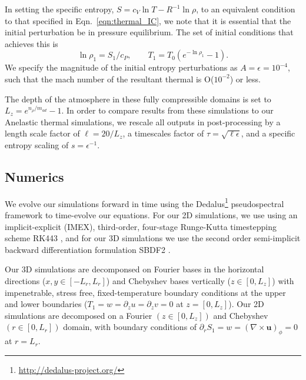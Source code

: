 \documentclass[twocolumn, amsmath, amsfonts, amssymb, trackchanges]{aastex62}
\newcommand{\grad}{\ensuremath{\nabla}}
\begin{document}
In setting the specific entropy, $S = c_V \ln T - R^{-1}\ln\rho$, to an equivalent condition
to that specified in  Eqn.~\ref{eqn:thermal_IC}, we note that it is essential that the
initial perturbation be in pressure equilibrium. The set of initial conditions that achieves this
is
\begin{equation}
\ln\rho_1 = S_1/c_P, \qquad T_1 = T_0(e^{-\ln\rho_1} - 1).
\end{equation}
We specify the magnitude of the initial entropy perturbations as 
$A = \epsilon = 10^{-4}$, such that the mach number of the resultant thermal is O($10^{-2}$) or less.

The depth of the atmosphere in these fully compressible domains is set to $L_z = e^{n_\rho/m_{ad}} - 1$.
In order to compare results from these
simulations to our Anelastic thermal simulations, we rescale all outputs in post-processing
by a length scale factor of $\ell = 20/L_z$, a timescales factor of  $\tau = \sqrt{\ell \epsilon}$,
and a specific entropy scaling of $s = \epsilon^{-1}$.

\subsection{Numerics}
We evolve our simulations forward in time using the 
Dedalus\footnote{\url{http://dedalus-project.org/}} 
pseudospectral framework \citep{burns&all2016} to time-evolve
our equations. For our 2D simulations, we use 
using an implicit-explicit (IMEX), third-order, four-stage
Runge-Kutta timestepping scheme RK443 \citep{ascher&all1997},
and for our 3D simulations we use the second order
semi-implicit backward differentiation formulation
SBDF2 \citep{wang&ruuth2008}.

Our 3D simulations are decomponsed on Fourier bases in the horizontal
directions ($x, y \in [-L_r, L_r]$) and Chebyshev bases vertically
($z \in [0, L_z]$) with impenetrable, stress free, fixed-temperature
boundary conditions at the upper and lower boundaries 
($T_1 = w = \partial_z u = \partial_z v = 0$ at $z = [0, L_z]$).
Our 2D simulations are decomposed on a Fourier $(z \in [0, L_z])$ and
Chebyshev $(r \in [0, L_r])$ domain, with boundary conditions of
$\partial_r S_1 = w = (\grad\times\bm{u})_{\phi} = 0$ at $r = L_r$.
\end{document}
